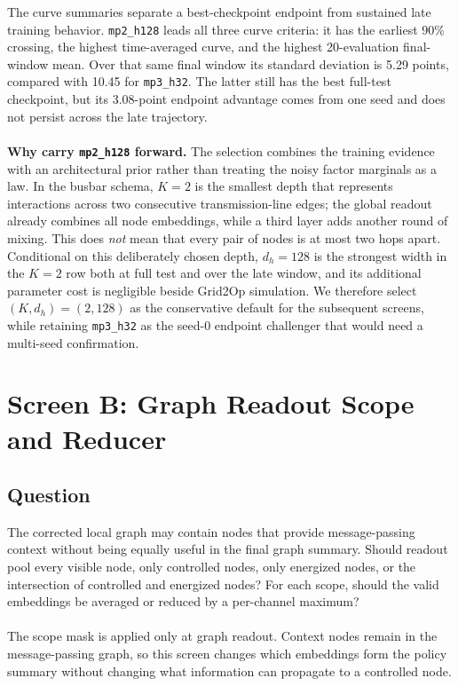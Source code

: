 The curve summaries separate a best-checkpoint endpoint from sustained late
training behavior. \texttt{mp2\_h128} leads all three curve criteria: it has the
earliest 90\% crossing, the highest time-averaged curve, and the highest
20-evaluation final-window mean. Over that same final window its standard
deviation is 5.29 points, compared with 10.45 for \texttt{mp3\_h32}. The latter
still has the best full-test checkpoint, but its 3.08-point endpoint advantage
comes from one seed and does not persist across the late trajectory.
\\
\\
\textbf{Why carry \texttt{mp2\_h128} forward.} The selection combines the
training evidence with an architectural prior rather than treating the noisy
factor marginals as a law. In the busbar schema, $K=2$ is the smallest depth
that represents interactions across two consecutive transmission-line edges;
the global readout already combines all node embeddings, while a third layer
adds another round of mixing. This does \emph{not} mean that every pair of
nodes is at most two hops apart. Conditional on this deliberately chosen depth,
$d_h=128$ is the strongest width in the $K=2$ row both at full test and over the
late window, and its additional parameter cost is negligible beside Grid2Op
simulation. We therefore select $(K,d_h)=(2,128)$ as the conservative default
for the subsequent screens, while retaining \texttt{mp3\_h32} as the seed-0
endpoint challenger that would need a multi-seed confirmation.

\section{Screen B: Graph Readout Scope and Reducer}
\label{sec:screen-encoder-pooling}

\subsection*{Question}

The corrected local graph may contain nodes that provide message-passing
context without being equally useful in the final graph summary. Should readout
pool every visible node, only controlled nodes, only energized nodes, or the
intersection of controlled and energized nodes? For each scope, should the
valid embeddings be averaged or reduced by a per-channel maximum?
\\
\\
The scope mask is applied only at graph readout. Context nodes remain in the
message-passing graph, so this screen changes which embeddings form the policy
summary without changing what information can propagate to a controlled node.


